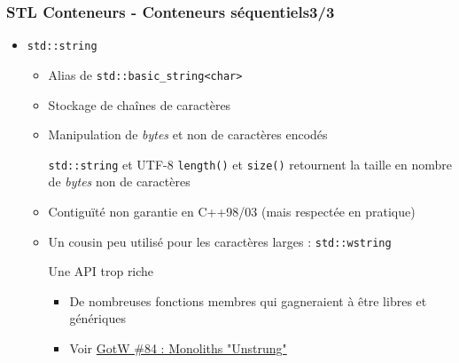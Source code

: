 \documentclass[C++.tex]{subfiles}
\begin{document}
\begin{frame}
	\frametitle{STL Conteneurs - Conteneurs séquentiels\titlehfill{}3/3}
	\begin{itemize}
		\item \lstinline|std::string|
		\begin{itemize}
			\item Alias de \lstinline|std::basic_string<char>|
			\item Stockage de chaînes de caractères
			\item Manipulation de \og \textit{bytes}\fg{} et non de caractères encodés

			\begin{alertblock}{\lstinline|std::string| et UTF-8}
				\lstinline|length()| et \lstinline|size()| retournent la taille en nombre de \textit{bytes} non de caractères
			\end{alertblock}

			\item Contiguïté non garantie en C++98/03 (mais respectée en pratique)


			\item Un cousin peu utilisé pour les caractères larges : \lstinline|std::wstring|

			\begin{alertblock}{Une API trop riche}
				\begin{itemize}
					\item De nombreuses fonctions membres qui gagneraient à être libres et génériques
					\item Voir \href{http://www.gotw.ca/gotw/084.htm}{GotW \#84 : Monoliths "Unstrung"}
				\end{itemize}
			\end{alertblock}
		\end{itemize}
	\end{itemize}
\end{frame}
\end{document}
